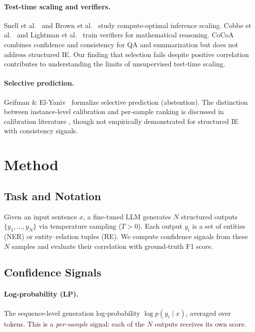 \documentclass[11pt,a4paper]{article}
\begin{document}
\paragraph{Test-time scaling and verifiers.}
Snell et al.~\cite{snell2024scaling} and Brown et al.~\cite{brown2024large} study compute-optimal inference scaling. Cobbe et al.~\cite{cobbe2021training} and Lightman et al.~\cite{lightman2023lets} train verifiers for mathematical reasoning. CoCoA \cite{cocoa2025} combines confidence and consistency for QA and summarization but does not address structured IE. Our finding that selection fails despite positive correlation contributes to understanding the limits of unsupervised test-time scaling.

\paragraph{Selective prediction.}
Geifman \& El-Yaniv~\cite{geifman2017selective} formalize selective prediction (abstention). The distinction between instance-level calibration and per-sample ranking is discussed in calibration literature \cite{kuleshov2015calibration,jagannatha2022structured}, though not empirically demonstrated for structured IE with consistency signals.

\section{Method}
\label{sec:method}

\subsection{Task and Notation}

Given an input sentence $x$, a fine-tuned LLM generates $N$ structured outputs $\{y_1, \ldots, y_N\}$ via temperature sampling ($T > 0$). Each output $y_i$ is a set of entities (NER) or entity--relation tuples (RE). We compute confidence signals from these $N$ samples and evaluate their correlation with ground-truth F1 score.

\subsection{Confidence Signals}

\paragraph{Log-probability (LP).} The sequence-level generation log-probability $\log p(y_i \mid x)$, averaged over tokens. This is a \emph{per-sample} signal: each of the $N$ outputs receives its own score.
\end{document}
